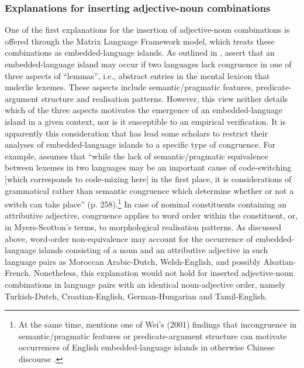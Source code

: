\subsubsection{Explanations for inserting adjective-noun combinations}\label{explanations}
One of the first explanations for the insertion of adjective-noun combinations is offered through the Matrix Language Framework model, which treats these combinations as embedded-language islands. As outlined in , \citet{myers-scotton-matching-1995} assert that an embedded-language island may occur if two languages lack congruence in one of three aspects of ``lemmas'', i.e., abstract entries in the mental lexicon that underlie lexemes. These aspects include semantic/pragmatic features, predicate-argument structure and realisation patterns. However, this view neither details which of the three aspects motivates the emergence of an embedded-language island in a given context, nor is it susceptible to an empirical verification. It is apparently this consideration that has lead some scholars to restrict their analyses of embedded-language islands to a specific type of congruence. For example, \citet{deuchar-congruence-2005} assumes that ``while the lack of semantic/pragmatic equivalence between lexemes in two languages may be an important cause of code-switching [which corresponds to code-mixing here] in the first place, it is considerations of grammatical rather than semantic congruence which determine whether or not a switch can take place'' (p. 258).\footnote{At the same time, \citet{deuchar-congruence-2005} mentions one of Wei's (2001) findings that incongruence in semantic/pragmatic features or predicate-argument structure can motivate occurrences of English embedded-language islands in otherwise Chinese discourse \citep[quoted in][258]{deuchar-congruence-2005}.} In case of nominal constituents containing an attributive adjective, congruence applies to word order within the constituent, or, in Myers-Scotton's terms, to morphological realisation patterns. As discussed above, word-order non-equivalence may account for the occurrence of embedded-language islands consisting of a noun and an attributive adjective in such language pairs as Moroccan Arabic-Dutch, Welsh-English, and possibly Alsatian-French. Nonetheless, this explanation would not hold for inserted adjective-noun combinations in language pairs with an identical noun-adjective order, namely Turkish-Dutch, Croatian-English, German-Hungarian and Tamil-English.

